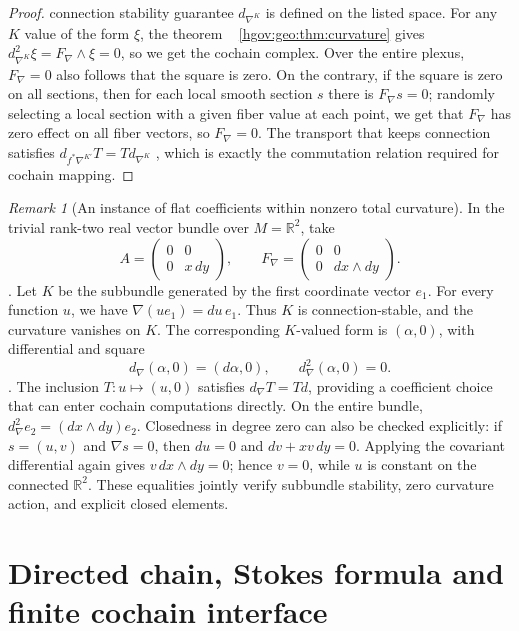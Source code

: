 \documentclass[12pt,a4paper,openany,notitlepage]{report}
\theoremstyle{plain}
\theoremstyle{definition}
\theoremstyle{remark}
\newtheorem{remark}[theorem]{Remark}
\begin{document}
\begin{CJK*}
\begin{proof}
connection stability guarantee $d_{\nabla^K}$ is defined on the listed space. For any $K$ value of the form $\xi$, the theorem ~ \ref{hgov:geo:thm:curvature} gives $d_{\nabla^K}^2\xi=F_\nabla\wedge\xi=0$, so we get the cochain complex. Over the entire plexus, $F_\nabla=0$ also follows that the square is zero. On the contrary, if the square is zero on all sections, then for each local smooth section $s$ there is $F_\nabla s=0$; randomly selecting a local section with a given fiber value at each point, we get that $F_\nabla$ has zero effect on all fiber vectors, so $F_\nabla=0$. The transport that keeps connection satisfies $d_{f^*\nabla^{K'}}T=T d_{\nabla^K}$ , which is exactly the commutation relation required for cochain mapping.\end{proof}


\begin{remark} [An instance of flat coefficients within nonzero total curvature]
In the trivial rank-two real vector bundle over $M=\mathbb R^2$, take
\[
A=\begin{pmatrix}0&0\\0&x\,dy\end{pmatrix},
\qquad
F_\nabla=\begin{pmatrix}0&0\\0&dx\wedge dy\end{pmatrix}.
\].
Let $K$ be the subbundle generated by the first coordinate vector $e_1$. For every function $u$, we have $\nabla(u e_1)=du\,e_1$. Thus $K$ is connection-stable, and the curvature vanishes on $K$. The corresponding $K$-valued form is $(\alpha,0)$, with differential and square
\[
d_\nabla(\alpha,0)=(d\alpha,0),\qquad
 d_\nabla^2(\alpha,0)=0.
\].
The inclusion $T:u\mapsto(u,0)$ satisfies $d_\nabla T=T d$, providing a coefficient choice that can enter cochain computations directly. On the entire bundle, $d_\nabla^2e_2=(dx\wedge dy)e_2$. Closedness in degree zero can also be checked explicitly: if $s=(u,v)$ and $\nabla s=0$, then $du=0$ and $dv+xv\,dy=0$. Applying the covariant differential again gives $v\,dx\wedge dy=0$; hence $v=0$, while $u$ is constant on the connected $\mathbb R^2$. These equalities jointly verify subbundle stability, zero curvature action, and explicit closed elements.
\end{remark}

\section { Directed chain, Stokes formula and finite cochain interface }\label{exp:geo:section:stokes}



\end{CJK*}
\end{document}
